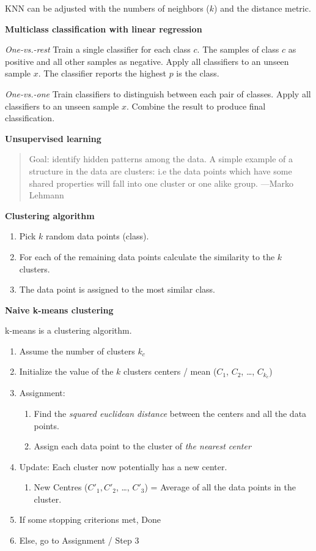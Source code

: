 \documentclass[11pt,twoside,landscape]{article}
\begin{document}
\begin{multicols}{3}
KNN can be adjusted with the numbers of neighbors (\(k\)) and the distance metric.


\textbf{Multiclass classification with linear regression}

\emph{One-vs.-rest}
Train a single classifier for each class \(c\).
The samples of class \(c\) as positive and all other samples as negative.
Apply all classifiers to an unseen sample \(x\).
The classifier reports the highest \(p\) is the class.


\emph{One-vs.-one}
Train classifiers to distinguish between each pair of classes.
Apply all classifiers to an unseen sample \(x\).
Combine the result to produce final classification.

\textbf{Unsupervised learning}

\begin{quote}
Goal: identify hidden patterns among the data.
A simple example of a structure in the data
are clusters: i.e the data points which
have some shared properties will fall into
one cluster or one alike group. ---Marko Lehmann
\end{quote}


\textbf{Clustering algorithm}

\begin{enumerate}
\item Pick \(k\) random data points (class).
\item For each of the remaining data points calculate the similarity to the \(k\) clusters.
\item The data point is assigned to the most similar class.
\end{enumerate}


\textbf{Naive k-means clustering}

k-means is a clustering algorithm.

\begin{enumerate}
\item Assume the number of clusters \(k_c\)
\item Initialize the value of the \(k\) clusters centers / mean (\(C_1\), \(C_2\), \ldots{}, \(C_{k_c}\))
\item Assignment:
\begin{enumerate}
\item Find the \emph{squared euclidean distance} between the centers and all the data points.
\item Assign each data point to the cluster of \emph{the nearest center}
\end{enumerate}
\item Update: Each cluster now potentially has a new center.
\begin{enumerate}
\item New Centres (\(C'_1, C'_2\), \ldots{}, \(C'_3\)) = Average of all the data points in the cluster.
\end{enumerate}
\item If some stopping criterions met, Done
\item Else, go to Assignment / Step 3
\end{enumerate}



\end{multicols}
\end{document}
